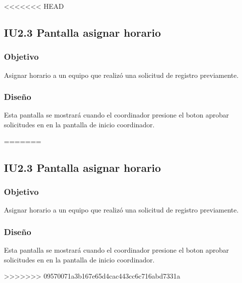 <<<<<<< HEAD
\subsection{IU2.3 Pantalla asignar horario}

\subsubsection{Objetivo}
	Asignar horario a un equipo que realizó una solicitud de registro previamente.

\subsubsection{Diseño}
	Esta pantalla se mostrará cuando el coordinador presione el boton aprobar solicitudes en en la pantalla de inicio coordinador.

=======
\subsection{IU2.3 Pantalla asignar horario}

\subsubsection{Objetivo}
	Asignar horario a un equipo que realizó una solicitud de registro previamente.

\subsubsection{Diseño}
	Esta pantalla se mostrará cuando el coordinador presione el boton aprobar solicitudes en en la pantalla de inicio coordinador.

>>>>>>> 09570071a3b167e65d4cac443cc6c716abd7331a

